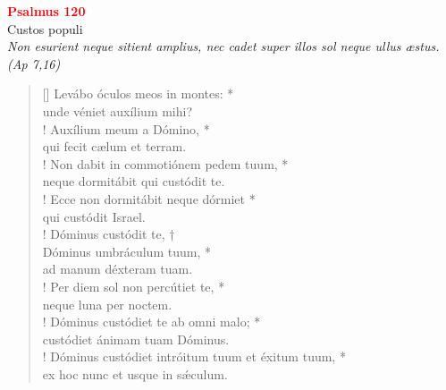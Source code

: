 


\def\greinitialformat#1{%
{\fontsize{39}{39}\selectfont #1}%
}




\vspace{0.3cm}
\begin{center}
 \textcolor{red}{\large \bf Psalmus 120}\\
Custos populi\\
\textit{\small Non esurient neque sitient amplius, nec cadet super illos sol neque ullus æstus. (Ap 7,16)}
\end{center}
\begin{verse}[\versewidth]
Levábo óculos meos in montes: *\\
unde véniet auxílium mihi?\\!
\vin Auxílium meum a Dómino, *\\
\vin qui fecit cælum et terram.\\!
Non dabit in commotiónem pedem tuum, *\\
neque dormitábit qui custódit te.\\!
\vin Ecce non dormitábit neque dórmiet *\\
\vin qui custódit Israel.\\!
Dóminus custódit te, †\\
Dóminus umbráculum tuum, *\\
ad manum déxteram tuam.\\!
\vin Per diem sol non percútiet te, *\\
\vin neque luna per noctem.\\!
Dóminus custódiet te ab omni malo; *\\
custódiet ánimam tuam Dóminus.\\!
\vin Dóminus custódiet intróitum tuum et éxitum tuum, *\\
\vin ex hoc nunc et usque in s\'{æ}culum.\\
\end{verse}
\vspace{1cm}



